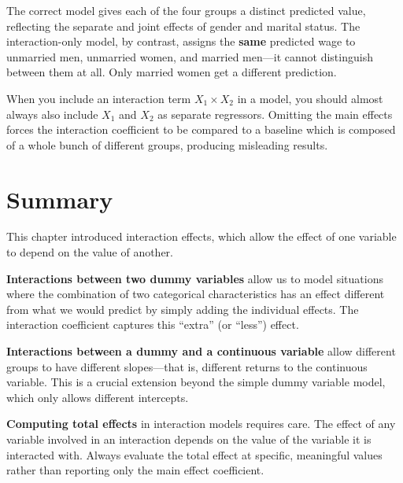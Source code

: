 \documentclass[
  letterpaper,
  DIV=11,
  numbers=noendperiod]{scrreprt}
\begin{document}
The correct model gives each of the four groups a distinct predicted
value, reflecting the separate and joint effects of gender and marital
status. The interaction-only model, by contrast, assigns the
\textbf{same} predicted wage to unmarried men, unmarried women, and
married men---it cannot distinguish between them at all. Only married
women get a different prediction.

\begin{tcolorbox}[enhanced jigsaw, arc=.35mm, bottomrule=.15mm, bottomtitle=1mm, breakable, colback=white, colbacktitle=quarto-callout-warning-color!10!white, colframe=quarto-callout-warning-color-frame, coltitle=black, left=2mm, leftrule=.75mm, opacityback=0, opacitybacktitle=0.6, rightrule=.15mm, title=\textcolor{quarto-callout-warning-color}{\faExclamationTriangle}\hspace{0.5em}{Always Include the Main Effects}, titlerule=0mm, toprule=.15mm, toptitle=1mm]

When you include an interaction term \(X_1 \times X_2\) in a model, you
should almost always also include \(X_1\) and \(X_2\) as separate
regressors. Omitting the main effects forces the interaction coefficient
to be compared to a baseline which is composed of a whole bunch of
different groups, producing misleading results.

\end{tcolorbox}

\section{Summary}\label{summary-3}

This chapter introduced interaction effects, which allow the effect of
one variable to depend on the value of another.

\textbf{Interactions between two dummy variables} allow us to model
situations where the combination of two categorical characteristics has
an effect different from what we would predict by simply adding the
individual effects. The interaction coefficient captures this ``extra''
(or ``less'') effect.

\textbf{Interactions between a dummy and a continuous variable} allow
different groups to have different slopes---that is, different returns
to the continuous variable. This is a crucial extension beyond the
simple dummy variable model, which only allows different intercepts.

\textbf{Computing total effects} in interaction models requires care.
The effect of any variable involved in an interaction depends on the
value of the variable it is interacted with. Always evaluate the total
effect at specific, meaningful values rather than reporting only the
main effect coefficient.
\end{document}

